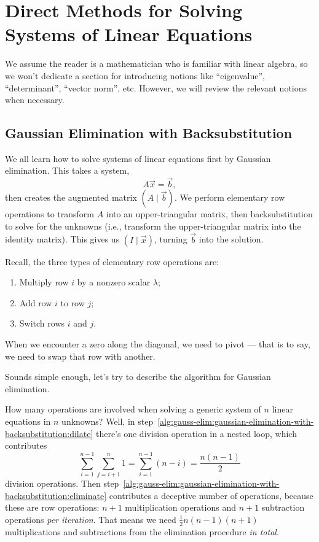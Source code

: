 \chapter{Direct Methods for Solving Systems of Linear Equations}

We assume the reader is a mathematician who is familiar with linear
algebra, so we won't dedicate a section for introducing notions like
``eigenvalue'', ``determinant'', ``vector norm'', etc. However, we will
review the relevant notions when necessary.

\section{Gaussian Elimination with Backsubstitution}

We all learn how to solve systems of linear equations first by Gaussian
elimination. This takes a system,
\begin{equation}
A\vec{x}=\vec{b},
\end{equation}
then creates the augmented matrix $(A\mid\vec{b})$. We perform
elementary row operations to transform $A$ into an upper-triangular
matrix, then backsubstitution to solve for the unknowns (i.e., transform
the upper-triangular matrix into the identity matrix). This gives us
$(I\mid\vec{x})$, turning $\vec{b}$ into the solution.

Recall, the three types of elementary row operations are:
\begin{enumerate}
\item Multiply row $i$ by a nonzero scalar $\lambda$;
\item Add row $i$ to row $j$;
\item Switch rows $i$ and $j$.
\end{enumerate}
When we encounter a zero along the diagonal, we need to pivot --- that
is to say, we need to swap that row with another.

Sounds simple enough, let's try to describe the algorithm for Gaussian
elimination.

How many operations are involved when solving a generic system of $n$
linear equations in $n$ unknowns? Well, in
step~\ref{alg:gauss-elim:gaussian-elimination-with-backsubstitution:dilate}
there's one division operation in a nested loop, which contributes
\begin{equation}
\sum^{n-1}_{i=1}\sum^{n}_{j=i+1}1 = \sum^{n-1}_{i=1}(n-i) = \frac{n(n-1)}{2}
\end{equation}
division operations. Then step~\ref{alg:gauss-elim:gaussian-elimination-with-backsubstitution:eliminate}
contributes a deceptive number of operations, because these are row
operations: $n+1$ multiplication operations and $n+1$ subtraction
operations \emph{per iteration}. That means we need
$\frac{1}{2}n(n-1)(n+1)$ multiplications and subtractions from the
elimination procedure \emph{in total}.

